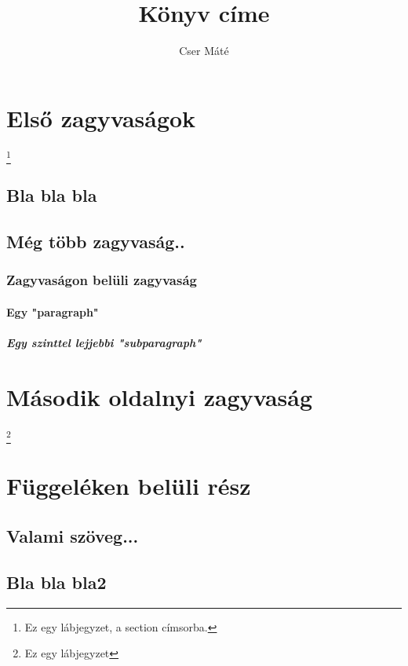 \documentclass[twocolumn]{book}
\begin{document}
\title{Könyv címe}
\author{Cser Máté}
\maketitle

\pagestyle{headings}
\pagestyle{myheadings}

\def\ps@headings{
  \def\@oddhead{\rightmark}  %
  \def\@evenhead{\leftmark}  %
  \def\@oddfoot{}
  \def\@evenfoot{}
}


\tableofcontents
\newpage

\section[zagyvaság]{Első zagyvaságok}
\footnote{Ez egy lábjegyzet, a section címsorba.}
\subsection{Bla bla bla}
\hulipsum[2]
\subsection{Még több zagyvaság..}
\hulipsum[2]
\subsubsection{Zagyvaságon belüli zagyvaság}
\paragraph{Egy "paragraph"}
\subparagraph{Egy szinttel lejjebbi "subparagraph"}
\newpage
\section{Második oldalnyi zagyvaság}
\hulipsum[2-3] \linebreak
\footnote{Ez egy lábjegyzet}

\appendix
\section{Függeléken belüli rész}
\subsection{Valami szöveg...}
\subsection{Bla bla bla2}
\end{document}
